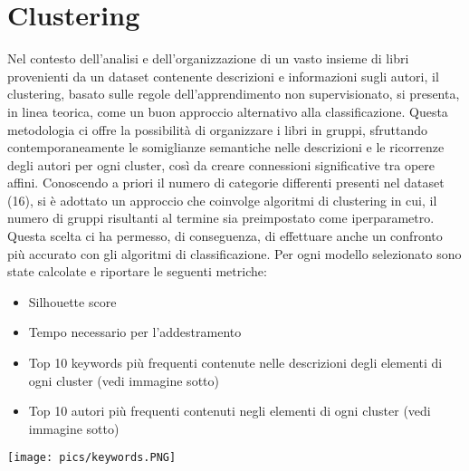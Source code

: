 \documentclass[12pt,oneside]{article}
\begin{document}
\section{Clustering}
    \begin{justify}
        Nel contesto dell'analisi e dell'organizzazione di un vasto insieme di libri provenienti da un dataset contenente descrizioni e informazioni sugli autori, il clustering, basato sulle regole dell'apprendimento non supervisionato, si presenta, in linea teorica, come un buon approccio alternativo alla classificazione. Questa metodologia ci offre la possibilità di organizzare i libri in gruppi, sfruttando contemporaneamente le somiglianze semantiche nelle descrizioni e le ricorrenze degli autori per ogni cluster, così da creare connessioni significative tra opere affini. Conoscendo a priori il numero di categorie differenti presenti nel dataset (16), si è adottato un approccio che coinvolge algoritmi di clustering in cui, il numero di gruppi risultanti al termine sia preimpostato come iperparametro. Questa scelta ci ha permesso, di conseguenza, di effettuare anche un confronto più accurato con gli algoritmi di classificazione.
        Per ogni modello selezionato sono state calcolate e riportare le seguenti metriche:
        \begin{itemize}
            \item Silhouette score
            \item Tempo necessario per l’addestramento
            \item Top 10 keywords più frequenti contenute nelle descrizioni degli elementi di ogni cluster (vedi immagine sotto)
            \item Top 10 autori più frequenti contenuti negli elementi di ogni cluster (vedi immagine sotto)
        \end{itemize}

        \texttt{[image: pics/keywords.PNG]}
    \end{justify}
\end{document}
